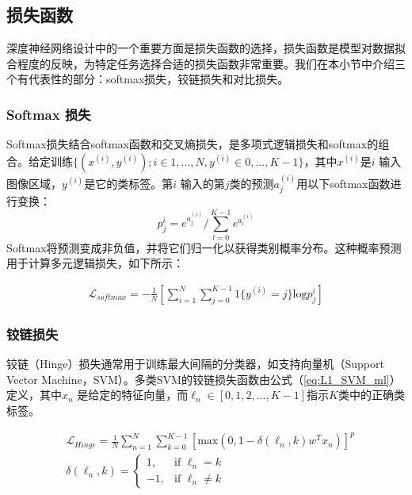 \subsection{损失函数}
深度神经网络设计中的一个重要方面是损失函数的选择，损失函数是模型对数据拟合程度的反映，为特定任务选择合适的损失函数非常重要。我们在本小节中介绍三个有代表性的部分：softmax损失，铰链损失和对比损失。

\subsubsection{Softmax 损失}
Softmax损失结合softmax函数和交叉熵损失，是多项式逻辑损失和softmax的组合。给定训练$\{(x^{(i)}, y^{(i)}); i\in {1,\dots,N}, y^{(i)}\in {0,\dots,K-1}\}$，其中$ x ^ {(i)} $是$ i $ 输入图像区域，$ y^{(i)} $是它的类标签。第$ i $ 输入的第$ j $类的预测$ a_j ^ {(i)} $用以下softmax函数进行变换：
\begin{equation}
\label{eq:softmax}
p_j^{i} =e^{a_j^{(i)}}/{\sum_{l=0}^{K-1}e^{a_l^{(i)}}}
\end{equation}
Softmax将预测变成非负值，并将它们归一化以获得类别概率分布。这种概率预测用于计算多元逻辑损失，如下所示：

\begin{equation}
\label{eq:softmaxloss}
\begin{aligned}
\mathcal{L}_{softmax} =-\frac{1}{N}[\sum_{i=1}^{N}\sum_{j=0}^{K-1}1\{y^{(i)}=j\}\mathrm{log} p_j^{i}]
\end{aligned}
\end{equation}

\subsubsection{铰链损失}
铰链（Hinge）损失通常用于训练最大间隔的分类器，如支持向量机（Support Vector Machine，SVM）。多类SVM的铰链损失函数由公式（\ref{eq:L1_SVM_ml}）定义，其中$ x_n $ 是给定的特征向量，而$ \ell_n \in [0,1,2,...,K-1] $指示$ K $类中的正确类标签。

\begin{equation} \label{eq:L1_SVM_ml}
\begin{aligned}
& \mathcal{L}_{Hinge} =\frac{1}{N}\sum_{n=1}^{N}\sum_{k=0}^{K-1}[\mathrm{max}(0,1-\delta(\ell_n,k)w^T x_n)]^p  \\
& \delta(\ell_n,k)=
\begin{cases}
1, & \text{if $\ell_n = k$} \\
-1, & \text{if $\ell_n \ne k$}
\end{cases}
\end{aligned}
\end{equation}

